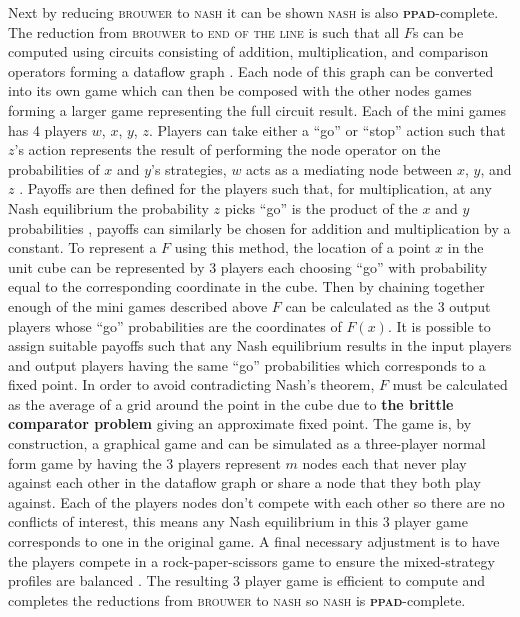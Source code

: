 \documentclass{article}
\begin{document}
\begin{multicols}{2}
Next by reducing \textsc{brouwer} to \textsc{nash} it can be shown \textsc{nash} is also \textbf{\textsc{ppad}}-complete. The reduction from \textsc{brouwer} to \textsc{end of the line} is such that all $F$s can be computed using circuits consisting of addition, multiplication, and comparison operators forming a dataflow graph \cite{Daskalakis.2009}. Each node of this graph can be converted into its own game which can then be composed with the other nodes games forming a larger game representing the full circuit result. Each of the mini games has 4 players $w$, $x$, $y$, $z$. Players can take either a ``go'' or ``stop'' action such that $z$'s action represents the result of performing the node operator on the probabilities of $x$ and $y$'s strategies, $w$ acts as a mediating node between $x$, $y$, and $z$ \cite{Daskalakis.2009}. Payoffs are then defined for the players such that, for multiplication, at any Nash equilibrium the probability $z$ picks ``go'' is the product of the $x$ and $y$ probabilities \cite{Daskalakis.2009}, payoffs can similarly be chosen for addition and multiplication by a constant. To represent a $F$ using this method, the location of a point $x$ in the unit cube can be represented by 3 players each choosing ``go'' with probability equal to the corresponding coordinate in the cube. Then by chaining together enough of the mini games described above $F$ can be calculated as the 3 output players whose ``go'' probabilities are the coordinates of $F(x)$. It is possible to assign suitable payoffs such that any Nash equilibrium results in the input players and output players having the same ``go'' probabilities which corresponds to a fixed point. In order to avoid contradicting Nash's theorem, $F$ must be calculated as the average of a grid around the point in the cube due to \textbf{the brittle comparator problem} \cite{Daskalakis.2009} giving an approximate fixed point. The game is, by construction, a graphical game \cite{Daskalakis.2009} and can be simulated as a three-player normal form game by having the 3 players represent $m$ nodes each that never play against each other in the dataflow graph or share a node that they both play against. Each of the players nodes don't compete with each other so there are no conflicts of interest, this means any Nash equilibrium in this 3 player game corresponds to one in the original game. A final necessary adjustment is to have the players compete in a rock-paper-scissors game to ensure the mixed-strategy profiles are balanced \cite{Daskalakis.2009}. The resulting 3 player game is efficient to compute and completes the reductions from \textsc{brouwer} to \textsc{nash} so \textsc{nash} is \textbf{\textsc{ppad}}-complete.

\end{multicols}
\end{document}
